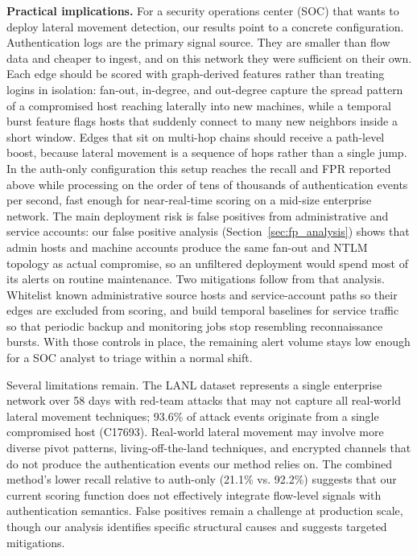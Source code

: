 \documentclass[letterpaper,twocolumn,10pt]{article}
\begin{document}
\textbf{Practical implications.} For a security operations center (SOC) that wants to deploy lateral movement detection, our results point to a concrete configuration. Authentication logs are the primary signal source. They are smaller than flow data and cheaper to ingest, and on this network they were sufficient on their own. Each edge should be scored with graph-derived features rather than treating logins in isolation: fan-out, in-degree, and out-degree capture the spread pattern of a compromised host reaching laterally into new machines, while a temporal burst feature flags hosts that suddenly connect to many new neighbors inside a short window. Edges that sit on multi-hop chains should receive a path-level boost, because lateral movement is a sequence of hops rather than a single jump. In the auth-only configuration this setup reaches the recall and FPR reported above while processing on the order of tens of thousands of authentication events per second, fast enough for near-real-time scoring on a mid-size enterprise network. The main deployment risk is false positives from administrative and service accounts: our false positive analysis (Section~\ref{sec:fp_analysis}) shows that admin hosts and machine accounts produce the same fan-out and NTLM topology as actual compromise, so an unfiltered deployment would spend most of its alerts on routine maintenance. Two mitigations follow from that analysis. Whitelist known administrative source hosts and service-account paths so their edges are excluded from scoring, and build temporal baselines for service traffic so that periodic backup and monitoring jobs stop resembling reconnaissance bursts. With those controls in place, the remaining alert volume stays low enough for a SOC analyst to triage within a normal shift.

Several limitations remain. The LANL dataset represents a single enterprise network over 58 days with red-team attacks that may not capture all real-world lateral movement techniques; 93.6\% of attack events originate from a single compromised host (C17693). Real-world lateral movement may involve more diverse pivot patterns, living-off-the-land techniques, and encrypted channels that do not produce the authentication events our method relies on. The combined method's lower recall relative to auth-only (21.1\% vs. 92.2\%) suggests that our current scoring function does not effectively integrate flow-level signals with authentication semantics. False positives remain a challenge at production scale, though our analysis identifies specific structural causes and suggests targeted mitigations.
\end{document}
